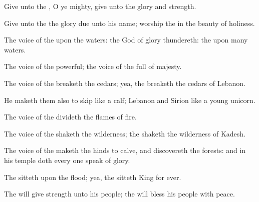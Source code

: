 {\Q {}Give unto the
{}, O ye
mighty,
give unto the
{}
glory and
strength.


\par }{\Q {}Give unto the
{} the
glory due unto his
name;
worship the
{} in the
beauty of
holiness.


\par }{\Q {}The
voice of the
{}
{} upon the
waters: the
God of
glory
thundereth: the
{}
{} upon
many
waters.


\par }{\Q {}The
voice of the
{}
{}
powerful; the
voice of the
{}
{} full of
majesty.


\par }{\Q {}The
voice of the
{}
breaketh the
cedars; yea, the
{}
breaketh the
cedars of
Lebanon.


\par }{\Q {}He maketh them also to
skip like a
calf;
Lebanon and
Sirion like a
young
unicorn.


\par }{\Q {}The
voice of the
{}
divideth the
flames of
fire.


\par }{\Q {}The
voice of the
{}
shaketh the
wilderness; the
{}
shaketh the
wilderness of
Kadesh.


\par }{\Q {}The
voice of the
{} maketh the
hinds to
calve, and
discovereth the
forests: and in his
temple doth every one
speak of
{}
glory.


\par }{\Q {}The
{}
sitteth upon the
flood; yea, the
{}
sitteth
King for
ever.


\par }{\Q {}The
{} will
give
strength unto his
people; the
{} will
bless his
people with
peace.




\par }
